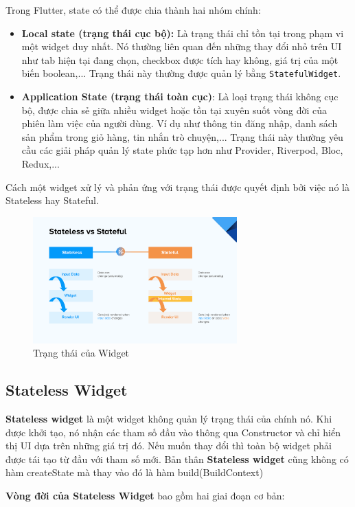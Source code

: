 \documentclass[../DoAn.tex]{subfiles}
\numberwithin{figure}{chapter}
\begin{document}
Trong Flutter, state có thể được chia thành hai nhóm chính:
\begin{itemize}
\item \textbf{Local state (trạng thái cục bộ): } Là trạng thái chỉ tồn tại trong phạm vi một widget duy nhất. Nó thường liên quan đến những thay đổi nhỏ trên UI như tab hiện tại đang chọn, checkbox được tích hay không, giá trị của một biến boolean,... Trạng thái này thường được quản lý bằng \texttt{StatefulWidget}.
\item \textbf{Application State (trạng thái toàn cục)}: Là loại trạng thái không cục bộ, được chia sẻ giữa nhiều widget hoặc tồn tại xuyên suốt vòng đời của phiên làm việc của người dùng. Ví dụ như thông tin đăng nhập, danh sách sản phẩm trong giỏ hàng, tin nhắn trò chuyện,... Trạng thái này thường yêu cầu các giải pháp quản lý state phức tạp hơn như Provider, Riverpod, Bloc, Redux,...
\end{itemize}

Cách một widget xử lý và phản ứng với trạng thái được quyết định bởi việc nó là Stateless hay Stateful.
\begin{figure}[H]
    \centering
    \includegraphics[width=0.7\textwidth]{Hinhve/Chuong5/stlessvastful.png}
    \caption{Trạng thái của Widget}
    \label{fig:stlessvastful}
\end{figure}

\subsection{Stateless Widget}
\textbf{Stateless widget} là một widget không quản lý trạng thái của chính nó. Khi được khởi tạo, nó nhận các tham số đầu vào thông qua Constructor và chỉ hiển thị UI dựa trên những giá trị đó. Nếu muốn thay đổi thì toàn bộ widget phải được tái tạo từ đầu với tham số mới. Bản thân \textbf{Stateless widget} cũng không có hàm createState mà thay vào đó là hàm build(BuildContext)

\textbf{Vòng đời của Stateless Widget} bao gồm hai giai đoạn cơ bản:
\end{document}
